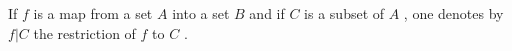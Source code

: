 
If \(f\) is a map from a set \(A\) into a set \(B\) and if \(C\) is a subset of \(A\) , one denotes by \(f|C\) the restriction of \(f\) to \(C\) .

